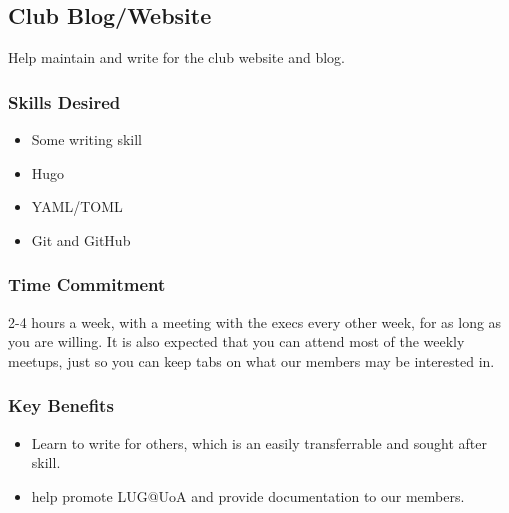 \documentclass[../proposal-for-projects-2025.tex]{subfiles}
\begin{document}
\subsection{Club Blog/Website}

Help maintain and write for the club website and blog.

\subsubsection*{Skills Desired}

\begin{multicols}{2}
	\begin{itemize}
		\item Some writing skill
		\item Hugo
		\item YAML/TOML
		\item Git and GitHub
	\end{itemize}
\end{multicols}


\subsubsection*{Time Commitment}

2-4 hours a week, with a meeting with the execs every other week, for as long as you are willing. It is also expected that you can attend most of the weekly meetups, just so you can keep tabs on what our members may be interested in.

\subsubsection*{Key Benefits}

\begin{itemize}
	\item Learn to write for others, which is an easily transferrable and sought after skill.
	\item help promote LUG@UoA and provide documentation to our members.
\end{itemize}
\end{document}
